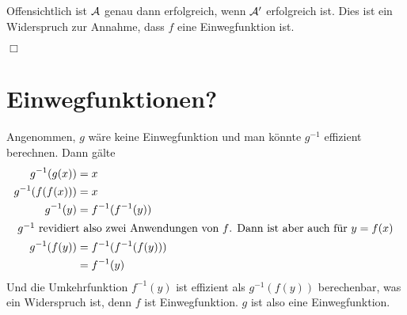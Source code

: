 \documentclass{../crypto}
\begin{document}
Offensichtlich ist $\mathcal{A}$ genau dann
erfolgreich, wenn $\mathcal{A}^\prime$ erfolgreich ist. Dies ist ein Widerspruch
zur Annahme, dass $f$ eine Einwegfunktion ist.

\hfill{}$\Box$


\section{Einwegfunktionen?}

Angenommen, $g$ wäre keine Einwegfunktion und man könnte $g^{-1}$ effizient
berechnen. Dann gälte 
\begin{align*}
   g^{-1}(g(x)) &= x \\
   g^{-1}(f(f(x))) &= x \\
   g^{-1}(y) &= f^{-1}(f^{-1}(y)) \\
   \intertext{
      $g^{-1}$ revidiert also zwei Anwendungen von $f$. Dann ist aber auch
      für $y=f(x)$
   }
   g^{-1}(f(y)) &= f^{-1}(f^{-1}(f(y))) \\
                &= f^{-1}(y)
\end{align*}
Und die Umkehrfunktion $f^{-1}(y)$ ist effizient als $g^{-1}(f(y))$ berechenbar,
was ein Widerspruch ist, denn $f$ ist Einwegfunktion. $g$ ist also eine
Einwegfunktion.
\end{document}
